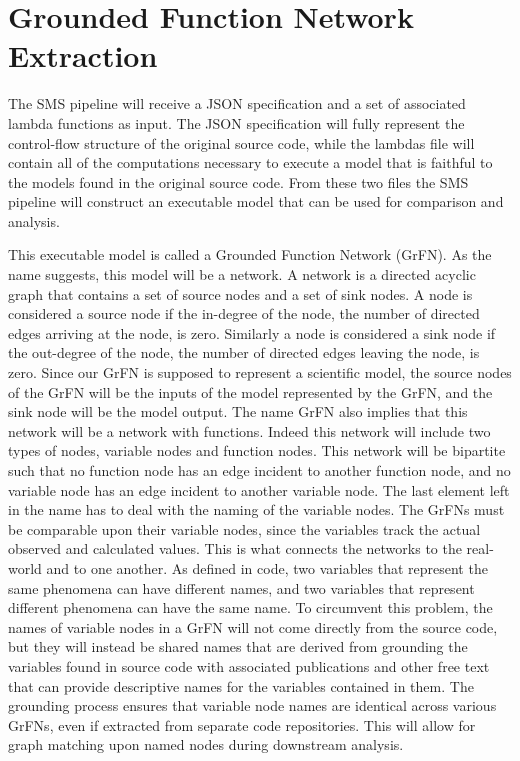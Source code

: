 \section{Grounded Function Network Extraction\label{sec:grfn_extract}}
The SMS pipeline will receive a JSON specification and a set of associated lambda functions as input. The JSON specification will fully represent the control-flow structure of the original source code, while the lambdas file will contain all of the computations necessary to execute a model that is faithful to the models found in the original source code. From these two files the SMS pipeline will construct an executable model that can be used for comparison and analysis.

This executable model is called a Grounded Function Network (GrFN). As the name suggests, this model will be a network. A network is a directed acyclic graph that contains a set of source nodes and a set of sink nodes. A node is considered a source node if the in-degree of the node, the number of directed edges arriving at the node, is zero. Similarly a node is considered a sink node if the out-degree of the node, the number of directed edges leaving the node, is zero. Since our GrFN is supposed to represent a scientific model, the source nodes of the GrFN will be the inputs of the model represented by the GrFN, and the sink node will be the model output. The name GrFN also implies that this network will be a network with functions. Indeed this network will include two types of nodes, variable nodes and function nodes. This network will be bipartite such that no function node has an edge incident to another function node, and no variable node has an edge incident to another variable node. The last element left in the name has to deal with the naming of the variable nodes. The GrFNs must be comparable upon their variable nodes, since the variables track the actual observed and calculated values. This is what connects the networks to the real-world and to one another. As defined in code, two variables that represent the same phenomena can have different names, and two variables that represent different phenomena can have the same name. To circumvent this problem, the names of variable nodes in a GrFN will not come directly from the source code, but they will instead be shared names that are derived from grounding the variables found in source code with associated publications and other free text that can provide descriptive names for the variables contained in them. The grounding process ensures that variable node names are identical across various GrFNs, even if extracted from separate code repositories. This will allow for graph matching upon named nodes during downstream analysis.

